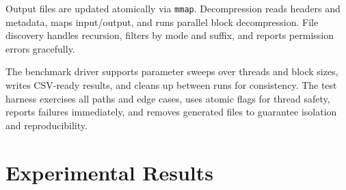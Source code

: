 \documentclass[10pt]{article}
\begin{document}
Output files are updated atomically via \texttt{mmap}. Decompression reads headers and metadata, maps input/output, and runs parallel block decompression. File discovery handles recursion, filters by mode and suffix, and reports permission errors gracefully.

The benchmark driver supports parameter sweeps over threads and block sizes, writes CSV-ready results, and cleans up between runs for consistency. The test harness exercises all paths and edge cases, uses atomic flags for thread safety, reports failures immediately, and removes generated files to guarantee isolation and reproducibility.

\section{Experimental Results}
\end{document}
